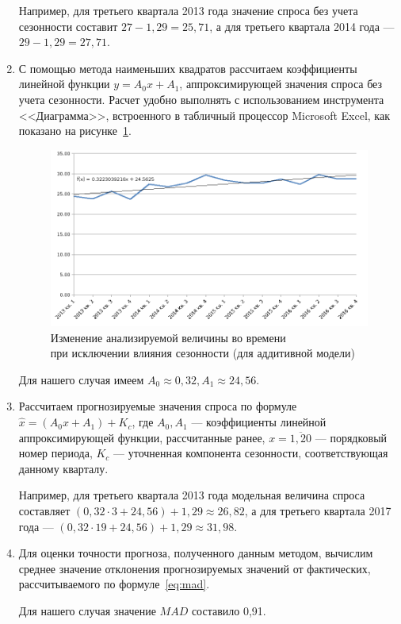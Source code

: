 \begin{enumerate}
  Например, для третьего квартала 2013 года значение спроса
  без учета сезонности составит \( 27 - 1{,}29 = 25{,}71 \),
  а для третьего квартала 2014 года ---
  \( 29 - 1{,}29 = 27{,}71 \).

\item С помощью метода наименьших квадратов рассчитаем коэффициенты
  линейной функции \( y = A_0 x + A_1 \), аппроксимирующей значения спроса
  без учета сезонности. Расчет удобно выполнять с использованием инструмента
  <<Диаграмма>>, встроенного в табличный процессор Microsoft Excel,
  как показано на рисунке~\ref{fig:add_without_season}.

  \begin{figure}[h!]
    \centering
    \includegraphics[width=150mm]{pic/add_without_season}
    \caption{Изменение анализируемой величины во времени \\
      при исключении влияния сезонности (для аддитивной модели)}
    \label{fig:add_without_season}
  \end{figure}

  Для нашего случая имеем \( A_0 \approx 0{,}32, A_1 \approx 24{,}56 \).

\item Рассчитаем прогнозируемые значения спроса по формуле
  \( \hat{x} = (A_0 x + A_1) + K_c \), где
  \( A_0, A_1 \) --- коэффициенты линейной аппроксимирующей функции,
  рассчитанные ранее,
  \( x = \overline{1,20} \) --- порядковый номер периода,
  \( K_c \) --- уточненная компонента сезонности, соответствующая
  данному кварталу.

  Например, для третьего квартала 2013 года модельная величина спроса
  составляет
  \( ( 0{,}32 \cdot 3 + 24{,}56 ) + 1{,}29 \approx 26{,}82 \),
  а для третьего квартала 2017 года ---
  \( ( 0{,}32 \cdot 19 + 24{,}56 ) + 1{,}29 \approx 31{,}98 \).

\item Для оценки точности прогноза, полученного данным методом, вычислим
  среднее значение отклонения прогнозируемых значений от фактических,
  рассчитываемого по формуле~\ref{eq:mad}.

  Для нашего случая значение \( MAD \) составило 0{,}91.
\end{enumerate}

